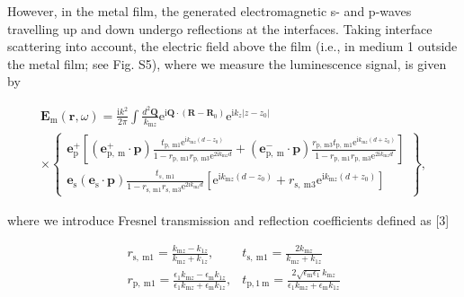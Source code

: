 \documentclass[10pt]{article}
\begin{document}
However, in the metal film, the generated electromagnetic s- and p-waves travelling up and down undergo reflections at the interfaces. Taking interface scattering into account, the electric field above the film (i.e., in medium 1 outside the metal film; see Fig. S5), where we measure the luminescence signal, is given by


\begin{gather*}
\mathbf{E}_{\mathrm{m}}(\mathbf{r}, \omega)=\frac{\mathrm{i} k^{2}}{2 \pi} \int \frac{d^{2} \mathbf{Q}}{k_{\mathrm{m} z}} \mathrm{e}^{\mathrm{i} \mathbf{Q} \cdot\left(\mathbf{R}-\mathbf{R}_{0}\right)} \mathrm{e}^{\mathrm{i} k_{z}\left|z-z_{0}\right|} \\
\times\left\{\begin{array}{c}
\mathbf{e}_{\mathrm{p}}^{+}\left[\left(\mathbf{e}_{\mathrm{p}, \mathrm{~m}}^{+} \cdot \mathbf{p}\right) \frac{t_{\mathrm{p}, \mathrm{~m} 1} \mathrm{e}^{\mathrm{i} k_{\mathrm{m} z}\left(d-z_{0}\right)}}{1-r_{\mathrm{p}, \mathrm{~m} 1} r_{\mathrm{p}, \mathrm{~m} 3} \mathrm{e}^{2 \mathrm{i} k_{\mathrm{m} z} d}}+\left(\mathbf{e}_{\mathrm{p}, \mathrm{~m}}^{-} \cdot \mathbf{p}\right) \frac{r_{\mathrm{p}, \mathrm{~m} 3} t_{\mathrm{p}, \mathrm{~m} 1} \mathrm{e}^{\mathrm{i} k_{\mathrm{m} z}\left(d+z_{0}\right)}}{1-r_{\mathrm{p}, \mathrm{~m} 1} r_{\mathrm{p}, \mathrm{~m} 3} \mathrm{e}^{2 \mathrm{i} k_{\mathrm{m} z} d}}\right] \\
\mathbf{e}_{\mathrm{s}}\left(\mathbf{e}_{\mathrm{s}} \cdot \mathbf{p}\right) \frac{t_{s, \mathrm{~m} 1}}{1-r_{\mathrm{s}, \mathrm{~m} 1} r_{\mathrm{s}, \mathrm{~m} 3} \mathrm{e}^{2 \mathrm{i} k_{\mathrm{m} z} d}}\left[\mathrm{e}^{\mathrm{i} k_{\mathrm{m} z}\left(d-z_{0}\right)}+r_{\mathrm{s}, \mathrm{~m} 3} \mathrm{e}^{\mathrm{i} k_{\mathrm{m} z}\left(d+z_{0}\right)}\right]
\end{array}\right\}, \tag{S1}
\end{gather*}


where we introduce Fresnel transmission and reflection coefficients defined as [3]

$$
\begin{array}{cc}
r_{\mathrm{s}, \mathrm{~m} 1}=\frac{k_{\mathrm{m} z}-k_{1 z}}{k_{\mathrm{m} z}+k_{1 z}}, & t_{\mathrm{s}, \mathrm{~m} 1}=\frac{2 k_{\mathrm{m} z}}{k_{\mathrm{m} z}+k_{1 z}} \\
r_{\mathrm{p}, \mathrm{~m} 1}=\frac{\epsilon_{1} k_{\mathrm{m} z}-\epsilon_{\mathrm{m}} k_{1 z}}{\epsilon_{1} k_{\mathrm{m} z}+\epsilon_{\mathrm{m}} k_{1 z}}, & t_{\mathrm{p}, 1 \mathrm{~m}}=\frac{2 \sqrt{\epsilon_{\mathrm{m}} \epsilon_{1}} k_{\mathrm{m} z}}{\epsilon_{1} k_{\mathrm{m} z}+\epsilon_{\mathrm{m}} k_{1 z}}
\end{array}
$$
\end{document}
